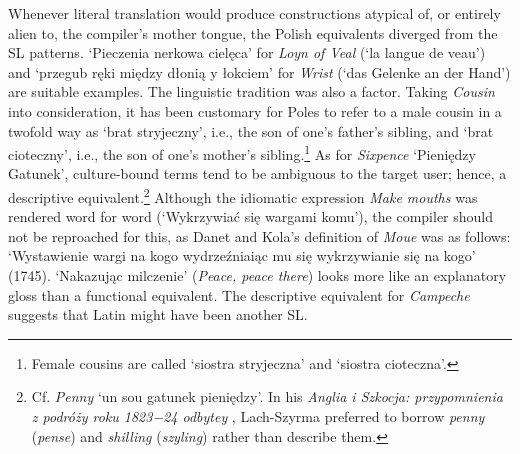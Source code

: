 \documentclass[output=paper,colorlinks,citecolor=brown,arabicfont,chinesefont]{langscibook}
\begin{document}
Whenever literal translation would produce constructions atypical of, or entirely alien to, the compiler’s mother tongue, the Polish equivalents diverged from the SL patterns. ‘Pieczenia nerkowa cielęca’ for \emph{Loyn of Veal} (‘la langue de veau’) and ‘przegub ręki między dłonią y łokciem’ for \emph{Wrist} (‘das Gelenke an der Hand’) are suitable examples. The linguistic tradition was also a factor. Taking \emph{Cousin} into consideration, it has been customary for Poles to refer to a male cousin in a twofold way as ‘brat stryjeczny’, i.e., the son of one’s father’s sibling, and ‘brat cioteczny’, i.e., the son of one’s mother’s sibling.\footnote{Female cousins are called ‘siostra stryjeczna’ and ‘siostra cioteczna’.} As for \emph{Sixpence} ‘Pieniędzy Gatunek’, culture-bound terms tend to be ambiguous to the target user; hence, a descriptive equivalent.\footnote{Cf. \emph{Penny} ‘un sou gatunek pieniędzy’. In his \emph{Anglia i Szkocja: przypomnienia z podróży roku 1823−24 odbytey} \citep{Lach-szyrma1828}, Lach-Szyrma preferred to borrow \emph{penny} (\emph{pense}) and \emph{shilling} (\emph{szyling}) rather than describe them.} Although the idiomatic expression \emph{Make mouths} was rendered word for word (‘Wykrzywiać się wargami komu’), the compiler should not be reproached for this, as Danet and Kola’s definition of \emph{Moue} was as follows: ‘Wystawienie wargi na kogo wydrzeźniaiąc mu się wykrzywianie się na kogo’ (1745). ‘Nakazując milczenie’ (\emph{Peace, peace there}) looks more like an explanatory gloss than a functional equivalent. The descriptive equivalent for \emph{Campeche} suggests that Latin might have been another SL.
\end{document}
